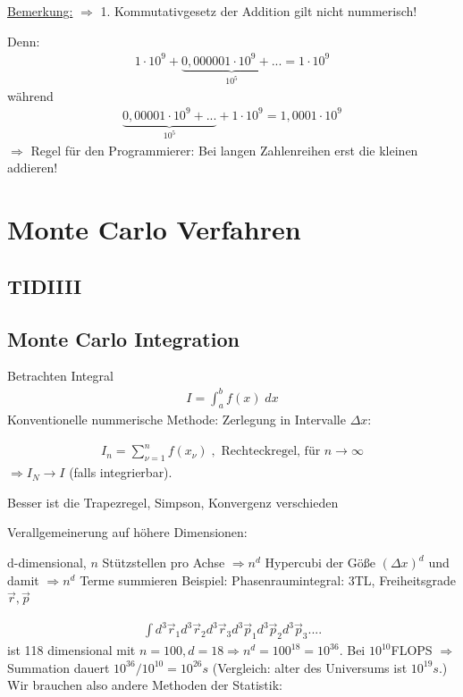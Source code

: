 \documentclass[12pt]{article}
\begin{document}
\begin{enumerate}
\begin{enumerate}
\underline{Bemerkung:} $\Rightarrow $ 1. Kommutativgesetz der Addition gilt nicht nummerisch! 

Denn:
\begin{align*}
1 \cdot 10^9 + \underbrace{ 0,000001 \cdot 10^9 + ... }_{10^{5}} = 1 \cdot 10^9
\end{align*}
während
\begin{align*}
\underbrace{0,00001 \cdot 10^9 + ... }_{10^5} + 1 \cdot 10^9 = 1,0001 \cdot 10^9
\end{align*}
$\Rightarrow$ Regel für den Programmierer: Bei langen Zahlenreihen erst die kleinen addieren! 
\end{enumerate}
\end{enumerate}

\section{Monte Carlo Verfahren}
\subsection{TIDIIII}
\subsection{ Monte Carlo Integration}
Betrachten Integral 
\begin{align}
I= \int_a^b f(x) \; dx
\end{align}
Konventionelle nummerische Methode: Zerlegung in Intervalle $\Delta x$:

\begin{align}
I_n= \sum_{\nu =1}^n f(x_\nu) \; , \mbox{ Rechteckregel, für } n \to \infty
\end{align}
$\Rightarrow I_N \to I$ (falls integrierbar).

Besser ist die Trapezregel, Simpson, Konvergenz verschieden

Verallgemeinerung auf höhere Dimensionen:

d-dimensional, $n$ Stützstellen pro Achse $\Rightarrow n^d$ Hypercubi der Göße $(\Delta x)^d$ und damit $\Rightarrow n^d$ Terme summieren
Beispiel: Phasenraumintegral: 3TL, Freiheitsgrade $\vec{r}, \vec{p}$

\begin{align}
\int d^3 \vec{r}_1 d^3 \vec{r}_2 d^3 \vec{r}_3 d^3 \vec{p}_1 d^3 \vec{p}_2 d^3 \vec{p}_3 .... 
\end{align} %
ist 118 dimensional mit $n=100, d=18 \Rightarrow n^d=100^18=10^36$. Bei $10^10$FLOPS
$\Rightarrow$ Summation dauert $10^{36 } / 10^{10}= 10^{26}s$ (Vergleich: alter des Universums ist $10^{19}s$.)
Wir brauchen also andere Methoden der Statistik:
\end{document}
